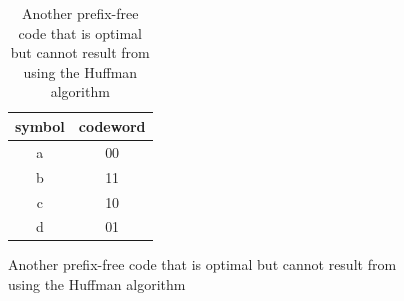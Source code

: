 \documentclass{assignment}
\begin{document}
\begin{sol}
\begin{itemize}
\begin{figure}[h]
            \begin{table}[H]
                \centering
                \caption{Another prefix-free code that is optimal but cannot result from using the Huffman algorithm}
                \label{A-8-P-2-c}
                \begin{tabular}{|c|c|}
                \hline
                symbol & codeword \\ \hline
                a & 00 \\ \hline
                b & 11 \\ \hline
                c & 10 \\ \hline
                d & 01 \\ \hline
                \end{tabular}
                \end{table}
        \end{figure}
    \end{itemize}
\end{sol}
\end{document}
